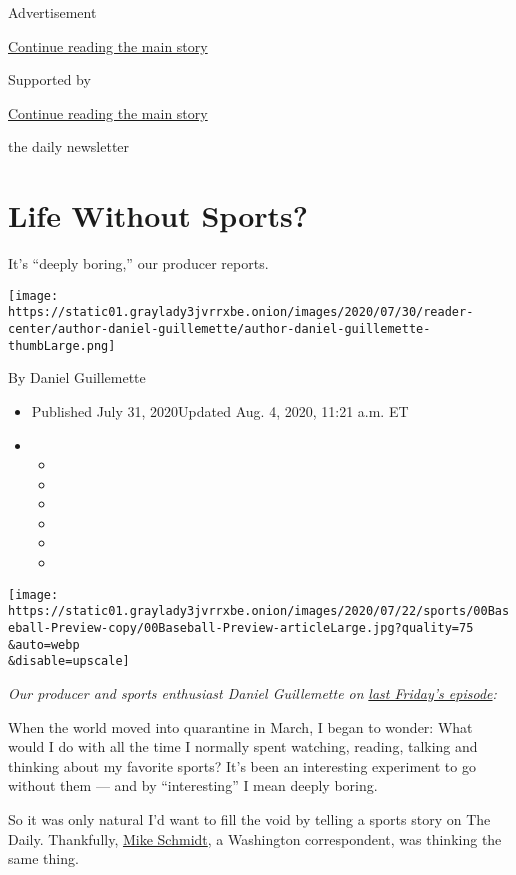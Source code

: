 Advertisement

\protect\hyperlink{after-top}{Continue reading the main story}

Supported by

\protect\hyperlink{after-sponsor}{Continue reading the main story}

the daily newsletter

\hypertarget{life-without-sports}{%
\section{Life Without Sports?}\label{life-without-sports}}

It's ``deeply boring,'' our producer reports.

\texttt{[image: https://static01.graylady3jvrrxbe.onion/images/2020/07/30/reader-center/author-daniel-guillemette/author-daniel-guillemette-thumbLarge.png]}

By Daniel Guillemette

\begin{itemize}
\item
  Published July 31, 2020Updated Aug. 4, 2020, 11:21 a.m. ET
\item
  \begin{itemize}
  \item
  \item
  \item
  \item
  \item
  \item
  \end{itemize}
\end{itemize}

\texttt{[image: https://static01.graylady3jvrrxbe.onion/images/2020/07/22/sports/00Baseball-Preview-copy/00Baseball-Preview-articleLarge.jpg?quality=75\\\&auto=webp\\\&disable=upscale]}

\emph{Our producer and sports enthusiast Daniel Guillemette on}
\href{https://www.nytimes3xbfgragh.onion/2020/07/24/podcasts/the-daily/mlb-baseball-season-coronavirus.html}{\emph{last
Friday's episode}}\emph{:}

When the world moved into quarantine in March, I began to wonder: What
would I do with all the time I normally spent watching, reading, talking
and thinking about my favorite sports? It's been an interesting
experiment to go without them --- and by ``interesting'' I mean deeply
boring.

So it was only natural I'd want to fill the void by telling a sports
story on The Daily. Thankfully,
\href{https://www.nytimes3xbfgragh.onion/by/michael-s-schmidt}{Mike
Schmidt}, a Washington correspondent, was thinking the same thing.

